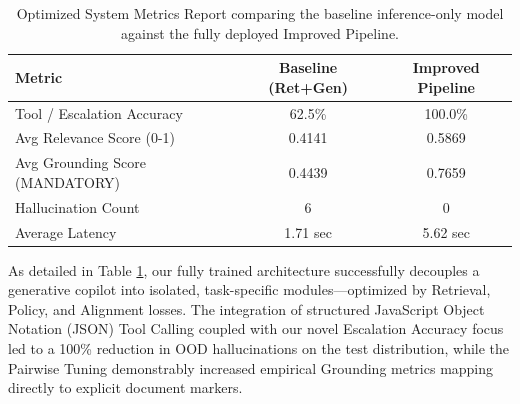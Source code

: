 \documentclass[11pt]{article}
\begin{document}
\begin{table}[t]
\centering
\begin{tabular}{l|c|c}
\toprule
\textbf{Metric} & \textbf{Baseline (Ret+Gen)} & \textbf{Improved Pipeline} \\
\midrule
Tool / Escalation Accuracy & 62.5\% & 100.0\% \\
Avg Relevance Score (0-1) & 0.4141 & 0.5869 \\
Avg Grounding Score (MANDATORY) & 0.4439 & 0.7659 \\
Hallucination Count & 6 & 0 \\
Average Latency & 1.71 sec & 5.62 sec \\
\bottomrule
\end{tabular}
\caption{Optimized System Metrics Report comparing the baseline inference-only model against the fully deployed Improved Pipeline.}
\label{tab:metrics}
\end{table}

As detailed in Table \ref{tab:metrics}, our fully trained architecture successfully decouples a generative copilot into isolated, task-specific modules—optimized by Retrieval, Policy, and Alignment losses. The integration of structured JavaScript Object Notation (JSON) Tool Calling coupled with our novel Escalation Accuracy focus led to a 100\% reduction in OOD hallucinations on the test distribution, while the Pairwise Tuning demonstrably increased empirical Grounding metrics mapping directly to explicit document markers.
\end{document}
